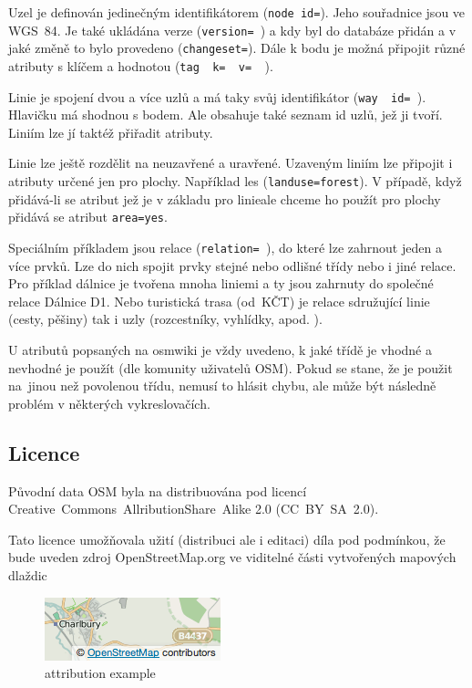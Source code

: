 Uzel je definován jedinečným identifikátorem ({\tt node id=}). Jeho 
souřadnice jsou ve WGS~­84. Je také ukládána verze ({\tt version= }) a kdy 
byl do databáze přidán a v jaké změně to bylo provedeno ({\tt changeset=}). 
Dále k bodu je možná připojit různé atributy s klíčem a hodnotou ({\tt tag~
k=~~v=~~}). 

Linie je spojení dvou a více uzlů a má taky svůj identifikátor ({\tt way~
id= }). Hlavičku má shodnou s bodem. Ale obsahuje také seznam id uzlů, 
jež ji tvoří. Liniím lze jí taktéž přiřadit atributy.  

Linie lze ještě rozdělit na neuzavřené a uravřené. Uzaveným liniím lze připojit 
i atributy určené jen pro plochy. Například les ({\tt landuse=forest}).
V případě, když přidává-li se atribut jež je v základu pro linieale chceme ho použít pro plochy přidává se atribut {\tt area=yes}.

Speciálním příkladem jsou relace ({\tt relation= }), do které lze zahrnout 
jeden a více prvků. Lze do nich spojit prvky stejné nebo odlišné třídy 
nebo i jiné relace. Pro příklad dálnice je tvořena mnoha liniemi a ty 
jsou zahrnuty do společné relace Dálnice D1. Nebo turistická trasa 
(od~KČT) je relace sdružující linie (cesty, pěšiny) tak i uzly 
(rozcestníky, vyhlídky, apod. ).

U atributů popsaných na osmwiki je vždy uvedeno, k jaké třídě je 
vhodné a nevhodné je použít (dle komunity uživatelů OSM). Pokud se stane, že je použit 
na~jinou než povolenou třídu, nemusí to hlásit chybu, ale může být následně 
problém v některých vykreslovačích. \cite{OSMfeatures}

\subsection{Licence}
\label{licence}

Původní data OSM byla na distribuována pod licencí 
Creative~Commons~Allribution­Share~Alike 2.0 (CC~BY~­SA~2.0). 


Tato licence umožňovala užití (distribuci ale i editaci) díla pod podmínkou, 
že bude uveden zdroj OpenStreetMap.org ve viditelné části 
vytvořených mapových dlaždic \cite{OSMlicence} 

  \begin{figure}[hbt]
    \centering
      \includegraphics{./pictures/attribution_example.png}
      \caption{attribution example}
      \label{fig:attribution_example}
  \end{figure} 

